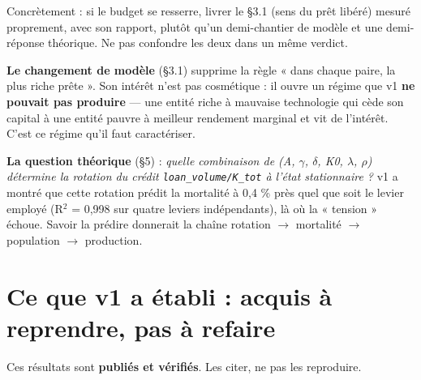 \documentclass[11pt,a4paper]{article}
\newcommand{\code}[1]{\texttt{#1}}
\begin{document}
Concrètement : si le budget se resserre, livrer le §3.1 (sens du prêt libéré) mesuré proprement, avec son rapport, plutôt qu'un demi-chantier de modèle et une demi-réponse théorique. Ne pas confondre les deux dans un même verdict.

\textbf{Le changement de modèle} (§3.1) supprime la règle « dans chaque paire, la plus riche prête ». Son intérêt n'est pas cosmétique : il ouvre un régime que v1 \textbf{ne pouvait pas produire} --- une entité riche à mauvaise technologie qui cède son capital à une entité pauvre à meilleur rendement marginal et vit de l'intérêt. C'est ce régime qu'il faut caractériser.

\textbf{La question théorique} (§5) : \emph{quelle combinaison de (A, \ensuremath{\gamma}, \ensuremath{\delta}, K0, \ensuremath{\lambda}, \ensuremath{\rho}) détermine la rotation du crédit \code{loan\_volume/K\_tot} à l'état stationnaire ?} v1 a montré que cette rotation prédit la mortalité à 0,4 \% près quel que soit le levier employé (R\ensuremath{^2} = 0,998 sur quatre leviers indépendants), là où la « tension » échoue. Savoir la prédire donnerait la chaîne rotation \ensuremath{\rightarrow} mortalité \ensuremath{\rightarrow} population \ensuremath{\rightarrow} production.

\bigskip

\setcounter{section}{1}
\section{Ce que v1 a établi : acquis à reprendre, pas à refaire}

Ces résultats sont \textbf{publiés et vérifiés}. Les citer, ne pas les reproduire.
\end{document}
